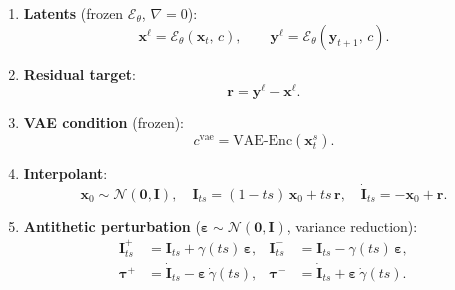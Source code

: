 \documentclass[11pt]{article}
\begin{document}
\begin{enumerate}
  \item \textbf{Latents} (frozen $\mathcal{E}_\theta$, $\nabla = 0$):
        \begin{equation}
          \mathbf{x}^{\ell} = \mathcal{E}_\theta(\mathbf{x}_t,\,c),
          \qquad
          \mathbf{y}^{\ell} = \mathcal{E}_\theta(\mathbf{y}_{t+1},\,c).
        \end{equation}

  \item \textbf{Residual target}:
        \begin{equation}
          \mathbf{r} = \mathbf{y}^{\ell} - \mathbf{x}^{\ell}.
        \end{equation}

  \item \textbf{VAE condition} (frozen):
        \begin{equation}
          c^{\mathrm{vae}} = \mathrm{VAE\text{-}Enc}\!\left(\mathbf{x}_t^s\right).
        \end{equation}

  \item \textbf{Interpolant}:
        \begin{equation}
          \mathbf{x}_0 \sim \mathcal{N}(\mathbf{0},\mathbf{I}),
          \quad
          \mathbf{I}_{ts} = (1-ts)\,\mathbf{x}_0 + ts\,\mathbf{r},
          \quad
          \dot{\mathbf{I}}_{ts} = -\mathbf{x}_0 + \mathbf{r}.
        \end{equation}

  \item \textbf{Antithetic perturbation}
        ($\bm{\varepsilon} \sim \mathcal{N}(\mathbf{0},\mathbf{I})$,
        variance reduction):
        \begin{align}
          \mathbf{I}_{ts}^+ &= \mathbf{I}_{ts} + \gamma(ts)\,\bm{\varepsilon},
          &
          \mathbf{I}_{ts}^- &= \mathbf{I}_{ts} - \gamma(ts)\,\bm{\varepsilon},\\
          \bm{\tau}^+ &= \dot{\mathbf{I}}_{ts} - \bm{\varepsilon}\,\dot{\gamma}(ts),
          &
          \bm{\tau}^- &= \dot{\mathbf{I}}_{ts} + \bm{\varepsilon}\,\dot{\gamma}(ts).
        \end{align}


\end{enumerate}
\end{document}
